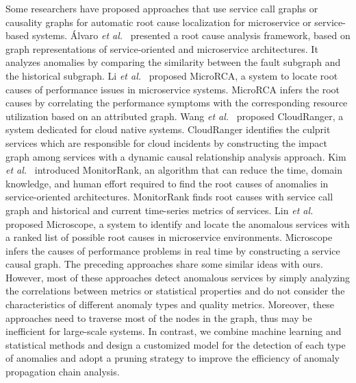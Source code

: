 Some researchers have proposed approaches that use service call graphs or causality graphs for automatic root cause localization for microservice or service-based systems.
{\'{A}}lvaro \emph{et al.}~\cite{GraphBasedformicroservice} presented a root cause analysis framework, based on graph representations of service-oriented and microservice architectures. It analyzes anomalies by comparing the similarity between the fault subgraph and the historical subgraph.
Li \emph{et al.}~\cite{NOMS2020MicroRCA} proposed MicroRCA, a system to locate root causes of performance issues in microservice systems. MicroRCA infers the root causes by correlating the performance symptoms with the corresponding resource utilization based on an attributed graph.
Wang \emph{et al.}~\cite{DCCGRID2018CloudRange} proposed CloudRanger, a system dedicated for cloud native systems. CloudRanger identifies the culprit services which are responsible for cloud incidents by constructing the impact graph among services with a dynamic causal relationship analysis approach. 
Kim \emph{et al.}~\cite{cscs2013monitorRank} introduced MonitorRank, an algorithm that can reduce the time, domain knowledge, and human effort required to find the root causes of anomalies in service-oriented architectures. MonitorRank finds root causes with service call graph and historical and current time-series metrics of services.
Lin \emph{et al.}~\cite{ICSOC2018Microscope} proposed Microscope, a system to identify and locate the anomalous services with a ranked list of possible root causes in microservice environments. Microscope infers the causes of performance problems in real time by constructing a service causal graph.
The preceding approaches share some similar ideas with ours.
However, most of these approaches detect anomalous services by simply analyzing the correlations between metrics or statistical properties and do not consider the characteristics of different anomaly types and quality metrics. 
Moreover, these approaches need to traverse most of the nodes in the graph, thus may be inefficient for large-scale systems.
In contrast, we combine machine learning and statistical methods and design a customized model for the detection of each type of anomalies and adopt a pruning strategy to improve the efficiency of anomaly propagation chain analysis.

